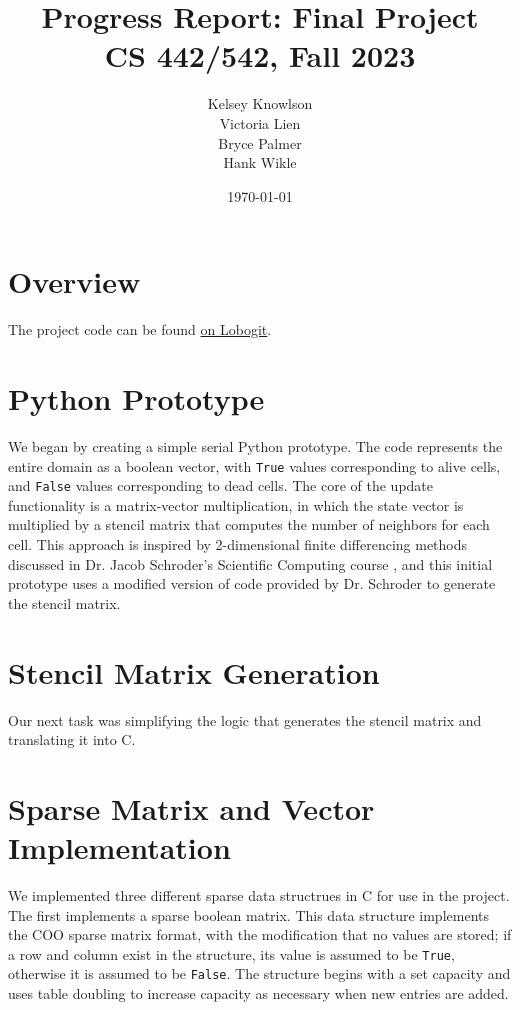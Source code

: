 \documentclass[12pt]{article}
\title{Progress Report: Final Project \\ CS 442/542, Fall 2023}
\author{
        Kelsey Knowlson \\
        Victoria Lien \\ 
        Bryce Palmer \\
        Hank Wikle
}
\date{\today}   %
\begin{document}
\maketitle
\clearpage

\section{Overview}

The project code can be found \href{https://lobogit.unm.edu/hwikle/game-of-life}{on Lobogit}.

\section{Python Prototype}

We began by creating a simple serial Python prototype. The code represents the entire domain as a boolean vector, with \texttt{True} values corresponding to alive cells, and \texttt{False} values corresponding to dead cells. The core of the update functionality is a matrix-vector multiplication, in which the state vector is multiplied by a stencil matrix that computes the number of neighbors for each cell. This approach is inspired by 2-dimensional finite differencing methods discussed in Dr. Jacob Schroder's Scientific Computing course \cite{cs471}, and this initial prototype uses a modified version of code provided by Dr. Schroder to generate the stencil matrix.

\section{Stencil Matrix Generation}

Our next task was simplifying the logic that generates the stencil matrix and translating it into C.

\section{Sparse Matrix and Vector Implementation}

We implemented three different sparse data structrues in C for use in the project. The first implements a sparse boolean matrix. This data structure implements the COO sparse matrix format, with the modification that no values are stored; if a row and column exist in the structure, its value is assumed to be \texttt{True}, otherwise it is assumed to be \texttt{False}. The structure begins with a set capacity and uses table doubling \cite{mit} to increase capacity as necessary when new entries are added. \\
\end{document}
